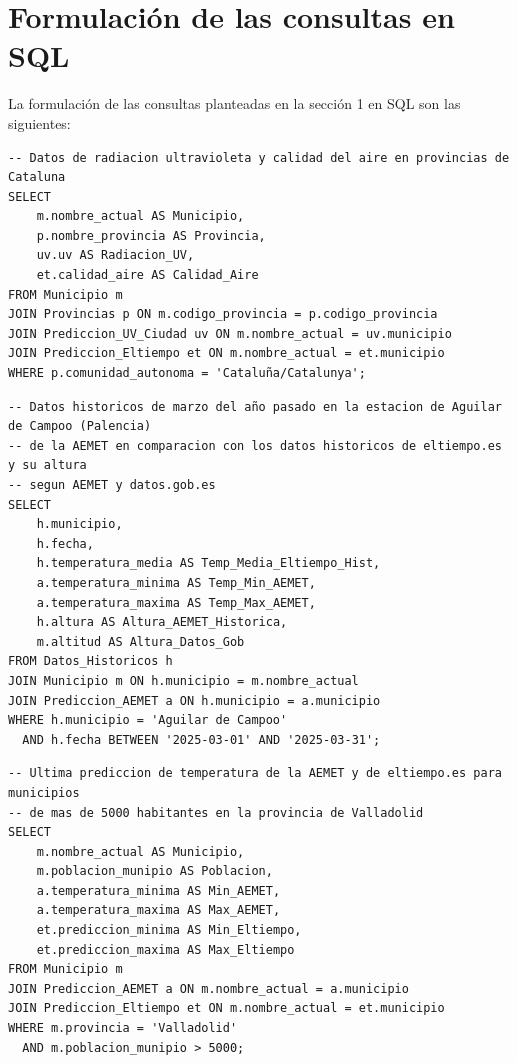 \documentclass[12pt, a4paper]{article}
\begin{document}
\section{Formulación de las consultas en SQL}

La formulación de las consultas planteadas en la sección 1 en SQL son las siguientes:

\begin{lstlisting}[caption={Datos de radiacion UV y calidad del aire en Cataluna}]
-- Datos de radiacion ultravioleta y calidad del aire en provincias de Cataluna
SELECT 
    m.nombre_actual AS Municipio, 
    p.nombre_provincia AS Provincia, 
    uv.uv AS Radiacion_UV, 
    et.calidad_aire AS Calidad_Aire
FROM Municipio m
JOIN Provincias p ON m.codigo_provincia = p.codigo_provincia
JOIN Prediccion_UV_Ciudad uv ON m.nombre_actual = uv.municipio
JOIN Prediccion_Eltiempo et ON m.nombre_actual = et.municipio
WHERE p.comunidad_autonoma = 'Cataluña/Catalunya';
\end{lstlisting}

\newpage

\begin{lstlisting}[caption={Comparativa historica Aguilar de Campoo}]
-- Datos historicos de marzo del año pasado en la estacion de Aguilar de Campoo (Palencia)
-- de la AEMET en comparacion con los datos historicos de eltiempo.es y su altura
-- segun AEMET y datos.gob.es
SELECT 
    h.municipio, 
    h.fecha,
    h.temperatura_media AS Temp_Media_Eltiempo_Hist,
    a.temperatura_minima AS Temp_Min_AEMET,
    a.temperatura_maxima AS Temp_Max_AEMET,
    h.altura AS Altura_AEMET_Historica,
    m.altitud AS Altura_Datos_Gob
FROM Datos_Historicos h
JOIN Municipio m ON h.municipio = m.nombre_actual
JOIN Prediccion_AEMET a ON h.municipio = a.municipio
WHERE h.municipio = 'Aguilar de Campoo' 
  AND h.fecha BETWEEN '2025-03-01' AND '2025-03-31';
\end{lstlisting}

\begin{lstlisting}[caption={Predicciones en Valladolid para municipios > 5000 hab.}]
-- Ultima prediccion de temperatura de la AEMET y de eltiempo.es para municipios
-- de mas de 5000 habitantes en la provincia de Valladolid
SELECT 
    m.nombre_actual AS Municipio,
    m.poblacion_munipio AS Poblacion,
    a.temperatura_minima AS Min_AEMET,
    a.temperatura_maxima AS Max_AEMET,
    et.prediccion_minima AS Min_Eltiempo,
    et.prediccion_maxima AS Max_Eltiempo
FROM Municipio m
JOIN Prediccion_AEMET a ON m.nombre_actual = a.municipio
JOIN Prediccion_Eltiempo et ON m.nombre_actual = et.municipio
WHERE m.provincia = 'Valladolid' 
  AND m.poblacion_munipio > 5000;
\end{lstlisting}
\end{document}
